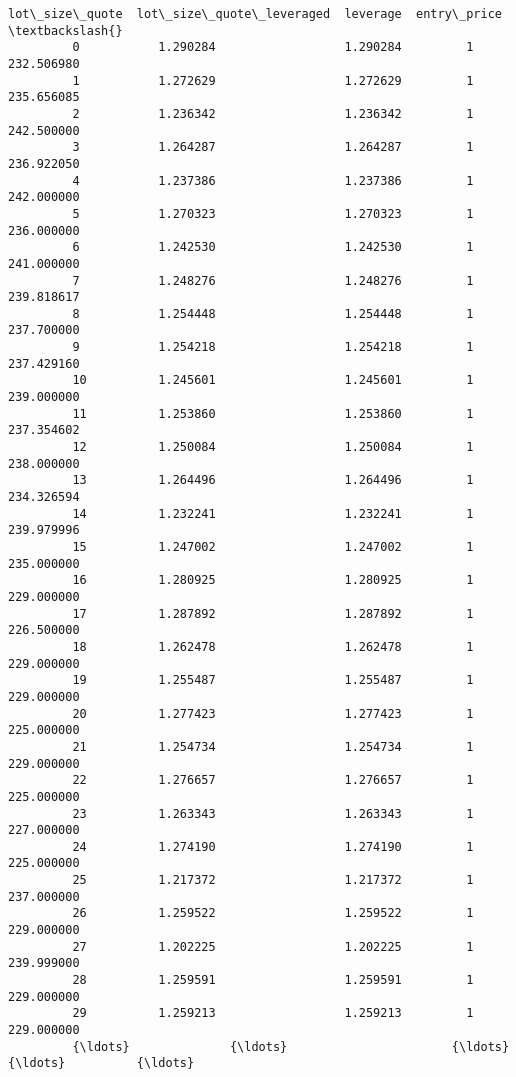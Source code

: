 \documentclass[11pt]{article}
\begin{document}
\begin{Verbatim}[commandchars=\\\{\}]
               lot\_size\_quote  lot\_size\_quote\_leveraged  leverage  entry\_price  \textbackslash{}
         0           1.290284                  1.290284         1   232.506980   
         1           1.272629                  1.272629         1   235.656085   
         2           1.236342                  1.236342         1   242.500000   
         3           1.264287                  1.264287         1   236.922050   
         4           1.237386                  1.237386         1   242.000000   
         5           1.270323                  1.270323         1   236.000000   
         6           1.242530                  1.242530         1   241.000000   
         7           1.248276                  1.248276         1   239.818617   
         8           1.254448                  1.254448         1   237.700000   
         9           1.254218                  1.254218         1   237.429160   
         10          1.245601                  1.245601         1   239.000000   
         11          1.253860                  1.253860         1   237.354602   
         12          1.250084                  1.250084         1   238.000000   
         13          1.264496                  1.264496         1   234.326594   
         14          1.232241                  1.232241         1   239.979996   
         15          1.247002                  1.247002         1   235.000000   
         16          1.280925                  1.280925         1   229.000000   
         17          1.287892                  1.287892         1   226.500000   
         18          1.262478                  1.262478         1   229.000000   
         19          1.255487                  1.255487         1   229.000000   
         20          1.277423                  1.277423         1   225.000000   
         21          1.254734                  1.254734         1   229.000000   
         22          1.276657                  1.276657         1   225.000000   
         23          1.263343                  1.263343         1   227.000000   
         24          1.274190                  1.274190         1   225.000000   
         25          1.217372                  1.217372         1   237.000000   
         26          1.259522                  1.259522         1   229.000000   
         27          1.202225                  1.202225         1   239.999000   
         28          1.259591                  1.259591         1   229.000000   
         29          1.259213                  1.259213         1   229.000000   
         {\ldots}              {\ldots}                       {\ldots}       {\ldots}          {\ldots}   

\end{Verbatim}
\end{document}
